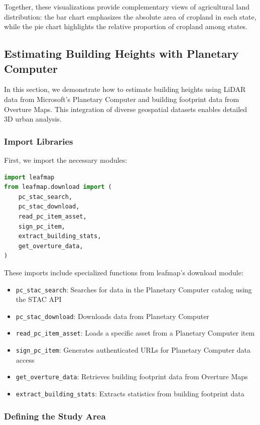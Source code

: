 Together, these visualizations provide complementary views of agricultural land distribution: the bar chart emphasizes the absolute area of cropland in each state, while the pie chart highlights the relative proportion of cropland among states.

\subsection{Estimating Building Heights with Planetary Computer}

In this section, we demonstrate how to estimate building heights using LiDAR data from Microsoft's Planetary Computer and building footprint data from Overture Maps. This integration of diverse geospatial datasets enables detailed 3D urban analysis.

\subsubsection{Import Libraries}

First, we import the necessary modules:

\begin{lstlisting}[language=Python]
import leafmap
from leafmap.download import (
    pc_stac_search,
    pc_stac_download,
    read_pc_item_asset,
    sign_pc_item,
    extract_building_stats,
    get_overture_data,
)
\end{lstlisting}

These imports include specialized functions from leafmap's download module:

\begin{itemize}
\item \texttt{pc\_stac\_search}: Searches for data in the Planetary Computer catalog using the STAC API
\item \texttt{pc\_stac\_download}: Downloads data from Planetary Computer
\item \texttt{read\_pc\_item\_asset}: Loads a specific asset from a Planetary Computer item
\item \texttt{sign\_pc\_item}: Generates authenticated URLs for Planetary Computer data access
\item \texttt{get\_overture\_data}: Retrieves building footprint data from Overture Maps
\item \texttt{extract\_building\_stats}: Extracts statistics from building footprint data
\end{itemize}

\subsubsection{Defining the Study Area}

